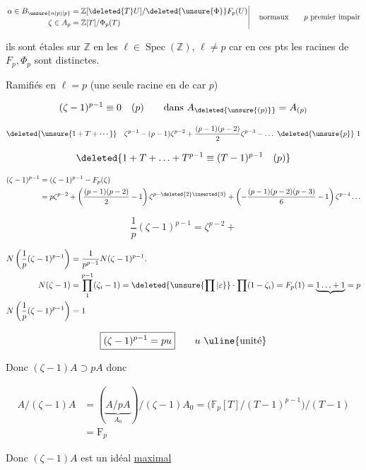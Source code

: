 
\[
\left.\begin{aligned}
\alpha\in B_{\unsure{n(p)|p}}&=\mathbb Z[\deleted{T}U]/\deleted{\unsure{\Phi}}F_p(U)\\
\zeta\in A_p&=\mathbb Z[T]/\Phi_p(T)
\end{aligned}\right|\quad\text{normaux}\qquad p\text{ premier impair}
\]

ils sont étales sur $\mathbb Z$ en les  $\ell\in\operatorname{Spec}(\mathbb Z)$, $\ell\ne p$ car en ces pts les racines de $F_p,\Phi_p$ sont distinctes.

Ramifiés en $\ell=p$ (une seule racine en  de car $p$)

\[
(\zeta-1)^{p-1}\equiv0\quad(p)\qquad\text{dans }A_{\deleted{\unsure{(p)}}}=A_{(p)}
\]

\[
\deleted{\unsure{1+T+\cdots}}\quad\zeta^{p-1}-(p-1)\zeta^{p-2}+\frac{(p-1)(p-2)}2\zeta^{p-3}-\ldots\ \deleted{\unsure{p}}\ 1
\]

\[
\deleted{1+T+\ldots+T^{p-1}\equiv(T-1)^{p-1}\quad(p)}
\]

\[
\begin{aligned}
(\zeta-1)^{p-1}&=(\zeta-1)^{p-1}-F_p(\zeta)\\
&=p\zeta^{p-2}+\left(\frac{(p-1)(p-2)}2-1\right)\zeta^{p-\deleted{2}\inserted{3}}+
\left(-\frac{(p-1)(p-2)(p-3)}6-1\right)\zeta^{p-4}\ldots
\end{aligned}
\]


\[
\frac1p(\zeta-1)^{p-1}=\zeta^{p-2}+
\]

\[
\begin{aligned}
N\left(\frac1p(\zeta-1)^{p-1}\right)&=\frac1{p^{p-1}}N(\zeta-1)^{p-1}.\\
N(\zeta-1)&=\prod_1^{p-1}(\zeta_i-1)=\deleted{\unsure{\prod|\varepsilon}}\cdot\prod(1-\zeta_i)=F_p(1)=\underbrace{1\ldots+1}=p\\
N\left(\frac1p(\zeta-1)^{p-1}\right)&=1
\end{aligned}
\]

\[
\boxed{(\zeta-1)^{p-1}=pu}\qquad u\ \text{\uline{unité}}
\]

Donc $(\zeta-1)A\supset pA$  donc

\[
\begin{aligned}
A/(\zeta-1)A&=(\underbrace{A/pA}_{A_0})/(\zeta-1)A_0=\bigl(\mathbb F_p[T]/(T-1)^{p-1}\bigr)/(T-1)\\
&=\mathrm F_p
\end{aligned}
\]

Donc $(\zeta-1)A$ est un idéal \uline{maximal}

